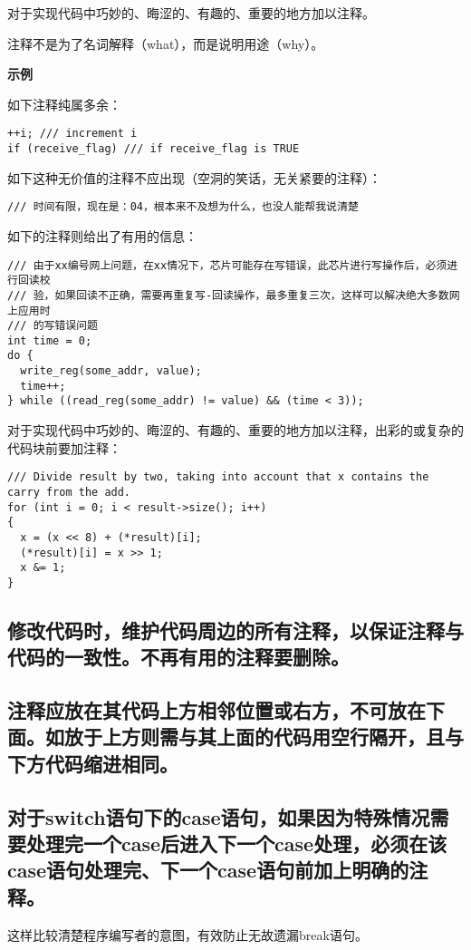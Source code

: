 对于实现代码中巧妙的、晦涩的、有趣的、重要的地方加以注释。

注释不是为了名词解释（what），而是说明用途（why）。

\textbf{示例}

如下注释纯属多余：
\begin{verbatim}
++i; /// increment i
if (receive_flag) /// if receive_flag is TRUE
\end{verbatim}

如下这种无价值的注释不应出现（空洞的笑话，无关紧要的注释）：
\begin{verbatim}
/// 时间有限，现在是：04，根本来不及想为什么，也没人能帮我说清楚
\end{verbatim}

如下的注释则给出了有用的信息：
\begin{verbatim}
/// 由于xx编号网上问题，在xx情况下，芯片可能存在写错误，此芯片进行写操作后，必须进行回读校
/// 验，如果回读不正确，需要再重复写-回读操作，最多重复三次，这样可以解决绝大多数网上应用时
/// 的写错误问题
int time = 0;
do {
  write_reg(some_addr, value);
  time++;
} while ((read_reg(some_addr) != value) && (time < 3));
\end{verbatim}

对于实现代码中巧妙的、晦涩的、有趣的、重要的地方加以注释，出彩的或复杂的代码块前要加注释：
\begin{verbatim}
/// Divide result by two, taking into account that x contains the carry from the add.
for (int i = 0; i < result->size(); i++)
{
  x = (x << 8) + (*result)[i];
  (*result)[i] = x >> 1;
  x &= 1;
}
\end{verbatim}


\subsection{修改代码时，维护代码周边的所有注释，以保证注释与代码的一致性。不再有用的注释要删除。}


\subsection{注释应放在其代码上方相邻位置或右方，不可放在下面。如放于上方则需与其上面的代码用空行隔开，且与下方代码缩进相同。}


\subsection{对于switch语句下的case语句，如果因为特殊情况需要处理完一个case后进入下一个case处理，必须在该case语句处理完、下一个case语句前加上明确的注释。}
这样比较清楚程序编写者的意图，有效防止无故遗漏break语句。

